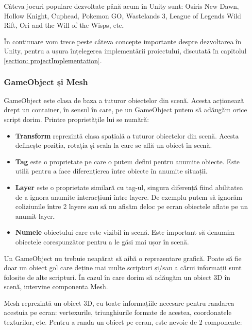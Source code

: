 \documentclass[12pt, a4paper]{article}
\begin{document}
	Câteva jocuri populare dezvoltate până acum în Unity sunt: Osiris New Dawn, Hollow Knight, Cuphead, Pokemon GO, Wastelands 3, League of Legends Wild Rift, Ori and the Will of the Wisps, etc.
	\newline
	
	În continuare vom trece peste câteva concepte importante despre dezvoltarea în Unity, pentru a ușura înțelegerea implementării proiectului, discutată în capitolul \hyperref[section: projectImplementation]{\ref{section: projectImplementation}}.
	
	
	
	
	\subsubsection{GameObject și Mesh}
	
	GameObject este clasa de baza a tuturor obiectelor din scenă. Acesta acționează drept un container, în sensul în care, pe un GameObject putem să adăugăm orice script dorim. Printre proprietățile lui se numără:
	
	\begin{itemize}
		\item \textbf{Transform} reprezintă clasa spațială a tuturor obiectelor din scenă. Acesta definește poziția, rotația și scala la care se află un obiect în scenă.
		\item \textbf{Tag} este o proprietate pe care o putem defini pentru anumite obiecte. Este utilă pentru a face diferențierea între obiecte în anumite situații. 
		\item \textbf{Layer} este o proprietate similară cu tag-ul, singura diferență fiind abilitatea de a ignora anumite interacțiuni între layere. De exemplu putem să ignorăm coliziunile între 2 layere sau să nu afișăm deloc pe ecran obiectele aflate pe un anumit layer.
		\item \textbf{Numele} obiectului care este vizibil în scenă. Este important să denumim obiectele corespunzător pentru a le găsi mai ușor în scenă.
	\end{itemize}
	
	Un GameObject nu trebuie neapărat să aibă o reprezentare grafică. Poate să fie doar un obiect gol care deține mai multe scripturi și/sau a cărui informații sunt folosite de alte scripturi. În cazul în care dorim să adăugăm un obiect 3D în scenă, intervine componenta Mesh.
	\newline
	
	Mesh reprezintă un obiect 3D, cu toate informațiile necesare pentru randarea acestuia pe ecran: vertexurile, triunghiurile formate de acestea, coordonatele texturilor, etc. Pentru a randa un obiect pe ecran, este nevoie de 2 componente:
	
\end{document}
